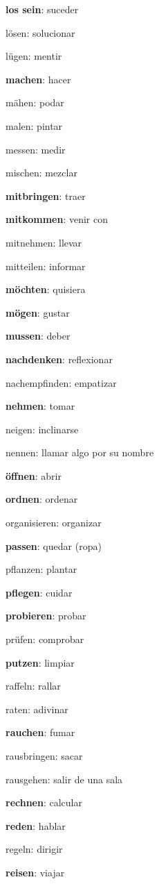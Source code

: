 \begin{multicols}{2}
\begin{myitemize}
\item \textbf{los sein}: suceder
\item lösen: solucionar
\item lügen: mentir
\item \textbf{machen}: hacer
\item mähen: podar
\item malen: pintar
\item messen: medir
\item mischen: mezclar
\item \textbf{mitbringen}: traer
\item \textbf{mitkommen}: venir con
\item mitnehmen: llevar
\item mitteilen: informar
\item \textbf{möchten}: quisiera
\item \textbf{mögen}: gustar
\item \textbf{mussen}: deber
\item \textbf{nachdenken}: reflexionar
\item nachempfinden: empatizar
\item \textbf{nehmen}: tomar
\item neigen: inclinarse
\item nennen: llamar algo por su nombre
\item \textbf{öffnen}: abrir
\item \textbf{ordnen}: ordenar
\item organisieren: organizar
\item \textbf{passen}: quedar (ropa)
\item pflanzen: plantar
\item \textbf{pflegen}: cuidar
\item \textbf{probieren}: probar
\item prüfen: comprobar
\item \textbf{putzen}: limpiar
\item raffeln: rallar
\item raten: adivinar
\item \textbf{rauchen}: fumar
\item rausbringen: sacar
\item rausgehen: salir de una sala
\item \textbf{rechnen}: calcular
\item \textbf{reden}: hablar
\item regeln: dirigir
\item \textbf{reisen}: viajar

\end{myitemize}
\end{multicols}

